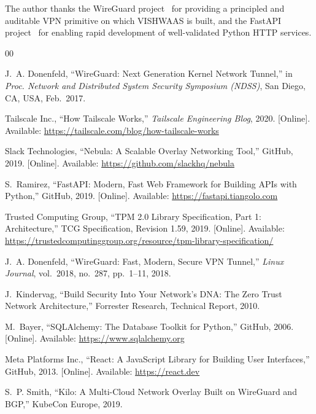 \documentclass[conference]{IEEEtran}
\begin{document}
The author thanks the WireGuard project~\cite{donenfeld2017wireguard} for
providing a principled and auditable VPN primitive on which VISHWAAS is built, and
the FastAPI project~\cite{fastapi} for enabling rapid development of
well-validated Python HTTP services.

\balance

\begin{thebibliography}{00}

J.~A. Donenfeld, ``WireGuard: Next Generation Kernel Network Tunnel,''
in \textit{Proc. Network and Distributed System Security Symposium (NDSS)},
San Diego, CA, USA, Feb.\ 2017.

Tailscale Inc., ``How Tailscale Works,''
\textit{Tailscale Engineering Blog}, 2020.
[Online]. Available: \url{https://tailscale.com/blog/how-tailscale-works}

Slack Technologies, ``Nebula: A Scalable Overlay Networking Tool,''
GitHub, 2019. [Online]. Available: \url{https://github.com/slackhq/nebula}

S.~Ramirez, ``FastAPI: Modern, Fast Web Framework for Building APIs with Python,''
GitHub, 2019. [Online]. Available: \url{https://fastapi.tiangolo.com}

Trusted Computing Group, ``TPM 2.0 Library Specification, Part 1: Architecture,''
TCG Specification, Revision 1.59, 2019.
[Online]. Available: \url{https://trustedcomputinggroup.org/resource/tpm-library-specification/}

J.~A. Donenfeld, ``WireGuard: Fast, Modern, Secure VPN Tunnel,''
\textit{Linux Journal}, vol.~2018, no.~287, pp.~1--11, 2018.

J.~Kindervag, ``Build Security Into Your Network's DNA: The Zero Trust Network Architecture,''
Forrester Research, Technical Report, 2010.

M.~Bayer, ``SQLAlchemy: The Database Toolkit for Python,''
GitHub, 2006. [Online]. Available: \url{https://www.sqlalchemy.org}

Meta Platforms Inc., ``React: A JavaScript Library for Building User Interfaces,''
GitHub, 2013. [Online]. Available: \url{https://react.dev}

S.~P. Smith, ``Kilo: A Multi-Cloud Network Overlay Built on WireGuard and BGP,''
KubeCon Europe, 2019.

\end{thebibliography}
\end{document}
